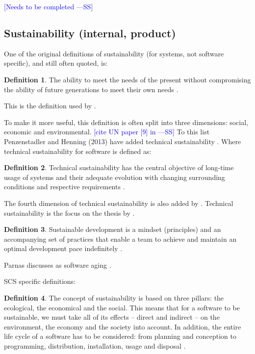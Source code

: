 \documentclass[letterpaper, cleveref]{lipics-v2019}
\newcommand{\authornote}[3]{\textcolor{#1}{[#3 ---#2]}}
\newcommand{\authornote}[3]{}
\newcommand{\wss}[1]{\authornote{blue}{SS}{#1}} %
\newcommand{\notdone}[1]{\textcolor{red}{#1}}
\theoremstyle{definition}
\newtheorem{defn}{Definition}
\begin{document}
\wss{Needs to be completed}


\subsection{Sustainability (internal, product)} %

One of the original definitions of sustainability (for systems, not software
specific), and still often quoted, is:

\begin{defn}
  \noindent The ability to meet the needs of the present without
  compromising the ability of future generations to meet their own needs
  \citep{Brundtland1987}.
\end{defn}

This is the definition used by \citet{IISD2019}.

To make it more useful, this definition is often split into three dimensions:
social, economic and environmental. \wss{cite UN paper [9] in
  \citet{PenzenstadlerAndHenning2013}} To this list Penzenstadler and Henning
(2013) have added technical sustainability \citep{PenzenstadlerAndHenning2013}.
Where technical sustainability for software is defined as:

\begin{defn}
  \noindent Technical sustainability has the central objective of long-time
  usage of systems and their adequate evolution with changing surrounding
  conditions and respective requirements \citep{PenzenstadlerAndHenning2013}.
\end{defn}

The fourth dimension of technical sustainability is also added by
\citep{WolframEtAl2017}.  Technical sustainability is the focus on the
thesis by \citet{Hygerth2016}.

\begin{defn}
  \noindent Sustainable development is a mindset (principles) and an
  accompanying set of practices that enable a team to achieve and maintain
  an optimal development pace indefinitely \citep{Tate2005}.
\end{defn}

Parnas discusses as software aging \citep{Parnas1994a}.

SCS specific definitions:

\begin{defn}
  The concept of sustainability is based on three pillars: the ecological, the
  economical and the social. This means that for a software to be sustainable,
  we must take all of its effects -- direct and indirect -- on the environment,
  the economy and the society into account. In addition, the entire life cycle
  of a software has to be considered: from planning and conception to
  programming, distribution, installation, usage and disposal \citep{Heine2017}.
\end{defn}
\end{document}
